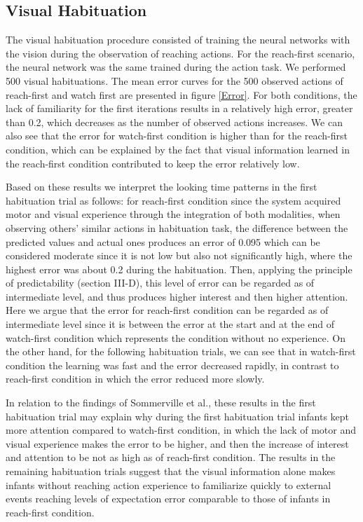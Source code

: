 \documentclass[conference]{IEEEtran}
\begin{document}
\subsection{Visual Habituation}
The visual habituation procedure consisted of training the neural networks with the vision during the observation of reaching actions. For the reach-first scenario, the neural network was the same trained during the action task. We performed 500 visual habituations. The mean error curves for the 500 observed actions of reach-first and watch first are presented in figure \ref{Error}. For both conditions, the lack of familiarity for the first iterations results in a relatively high error, greater than 0.2, which decreases as the number of observed actions increases. We can also see that the error for watch-first condition is higher than for the reach-first condition, which can be explained by the fact that visual information learned in the reach-first condition contributed to keep the error relatively low.

Based on these results we interpret the looking time patterns in the first habituation trial as follows: for reach-first condition since the system acquired motor and visual experience through the integration of both modalities, when observing others' similar actions in habituation task, the difference between the predicted values and actual ones produces an error of 0.095 which can be considered moderate since it is not low but also not significantly high, where the highest error was about 0.2 during the habituation. Then, applying the principle of predictability (section III-D), this level of error can be regarded as of intermediate level, and thus produces higher interest and then higher attention. Here we argue that the error for reach-first condition can be regarded as of intermediate level since it is between the error at the start and at the end of watch-first condition which represents the condition without no experience. On the other hand, for the following habituation trials, we can see that in watch-first condition the learning was fast and the error decreased rapidly, in contrast to reach-first condition in which the error reduced more slowly.

In relation to the findings of Sommerville et al.\cite{sommerville2005action}, these results in the first habituation trial may explain why during the first habituation trial infants kept more attention compared to watch-first condition, in which the lack of motor and visual experience makes the error to be higher, and then the increase of interest and attention to be not as high as of reach-first condition. The results in the remaining habituation trials suggest that the visual information alone makes infants without reaching action experience to familiarize quickly to external events reaching levels of expectation error comparable to those of infants in reach-first condition.
\end{document}

